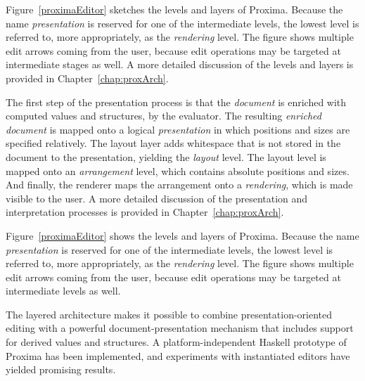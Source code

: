 \bc
Figure~\ref{proximaEditor} sketches the levels and layers of Proxima. Because the name {\em presentation} is reserved for one of the intermediate levels, the lowest level is referred to, more appropriately, as the {\em rendering} level. The figure shows multiple edit arrows coming from the user, because edit operations may be targeted at intermediate stages as well. A more detailed discussion of the levels and layers is provided in Chapter~\ref{chap:proxArch}. 
\ec

The first step of the presentation process is that the {\em document} is enriched with computed values and structures, by the evaluator. The resulting {\em enriched document} is mapped onto a logical {\em presentation} in which positions and sizes are specified relatively. The layout layer adds whitespace that is not stored in the document to the presentation, yielding the {\em layout} level. The layout level is mapped onto an {\em arrangement} level, which contains absolute positions and sizes. And finally, the renderer maps the arrangement onto a {\em rendering}, which is made visible to the user. A more detailed discussion of the presentation and interpretation processes is provided in Chapter~\ref{chap:proxArch}.


Figure~\ref{proximaEditor} shows the levels and layers of Proxima. Because the name {\em presentation} is reserved for one of the intermediate levels, the lowest level is referred to, more appropriately, as the {\em rendering} level. The figure shows multiple edit arrows coming from the user, because edit operations may be targeted at intermediate levels as well.

The layered architecture makes it possible to combine presentation-oriented editing with a powerful document-presentation mechanism that includes support for derived values and structures. A platform-independent Haskell prototype of Proxima has been implemented, and experiments with instantiated editors have yielded promising results.

